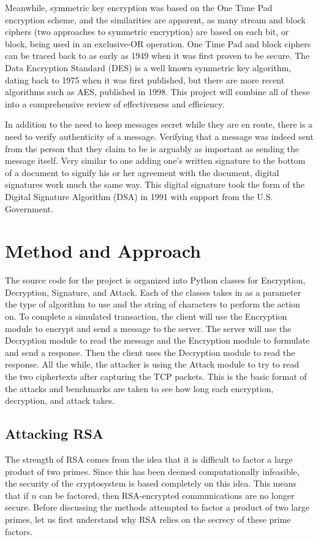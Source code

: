 \documentclass[12pt]{report}
\begin{document}
Meanwhile, symmetric key encryption was based on the One Time Pad encryption scheme, and the similarities are apparent, as many stream and block ciphers (two approaches to symmetric encryption) are based on each bit, or block, being used in an exclusive-OR operation. One Time Pad and block ciphers can be traced back to as early as 1949 when it was first proven to be secure. The Data Encryption Standard (DES) is a well known symmetric key algorithm, dating back to 1975 when it was first published, but there are more recent algorithms such as AES, published in 1998. This project will combine all of these into a comprehensive review of effectiveness and efficiency.

In addition to the need to keep messages secret while they are en route, there is a need to verify authenticity of a message. Verifying that a message was indeed sent from the person that they claim to be is arguably as important as sending the message itself. Very similar to one adding one's written signature to the bottom of a document to signify his or her agreement with the document, digital signatures work much the same way. This digital signature took the form of the Digital Signature Algorithm (DSA) in 1991 with support from the U.S. Government.\cite{mit}\cite{dsa}

\section{Method and Approach}
The source code for the project is organized into Python classes for Encryption, Decryption, Signature, and Attack. Each of the classes takes in as a parameter the type of algorithm to use and the string of characters to perform the action on. To complete a simulated transaction, the client will use the Encryption module to encrypt and send a message to the server. The server will use the Decryption module to read the message and the Encryption module to formulate and send a response. Then the client uses the Decryption module to read the response. All the while, the attacker is using the Attack module to try to read the two ciphertexts after capturing the TCP packets. This is the basic format of the attacks and benchmarks are taken to see how long each encryption, decryption, and attack takes.

\subsection{Attacking RSA}
The strength of RSA comes from the idea that it is difficult to factor a large product of two primes. Since this has been deemed computationally infeasible, the security of the cryptosystem is based completely on this idea. This means that if $n$ can be factored, then RSA-encrypted communications are no longer secure. Before discussing the methods attempted to factor a product of two large primes, let us first understand why RSA relies on the secrecy of these prime factors.
\end{document}
